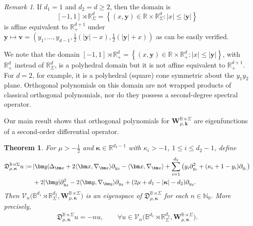 \documentclass{amsart}
\newtheorem{thm}{Theorem}[section]
\theoremstyle{remark}
\newtheorem{rem}{Remark}[section]\newtheorem*{notation}{Notation}
\def\la{{\langle}}
\def\ra{{\rangle}}
\def\fD{{\mathfrak D}}
\def\k{{\kappa}}
\def\la{{\langle}}
\def\ra{{\rangle}}
\def\kb{{\bm k}}
\def\vb{{\bm v}}
\def\yb{{\bm y}}
\def\Wb{{\bm W}}
\def\CV{{\mathcal V}}
\def\BB{{\mathbb B}}
\def\NN{{\mathbb N}}
\def\RR{{\mathbb R}}
\def\bk{{\boldsymbol{\kappa}}}
\def\f{\frac}
\begin{document}
\begin{rem} \label{rem:B-Sig}
If $d_1 =1$ and $d_2 = d \ge 2$, then the domain is 
$$
 [-1,1] \rtimes \RR_\Sigma^d = \left \{(x, \yb) \in \RR \times \RR_\Sigma^d: |x| \le |\yb| \right\}
$$
is affine equivalent to $\RR_+^{d+1}$ under $\yb \mapsto \vb = (y_1,\ldots, y_{d-1}, \frac12(|\yb|- x), \frac12 (|\yb|+x))$
as can be easily verified.  

We note that the domain $[-1,1] \rtimes \RR_+^d = \left \{(x, \yb) \in \RR \times \RR_+^d: |x| \le |\yb| \right\}$,
with $\RR_+^d$ instead of $\RR_\Sigma^d$, is a polyhedral domain but it is not affine equivalent to $\RR_+^{d+1}$. 
For $d = 2$, for example, it is a polyhedral (square) cone symmetric about the $y_1 y_2$ plane. 
Orthogonal polynomials on this domain are not wrapped products of classical orthogonal polynomials, 
nor do they possess a second-degree spectral operator.
\end{rem}

Our main result shows that orthogonal polynomials for $\Wb_{\mu, \kb}^{\BB\rtimes \Sigma}$ are 
eigenfunctions of a second-order differential operator. 

\begin{thm}\label{thm:B-Sig}
For $\mu > -\f12$ and $\bk \in \RR^{d_2-1}$ with $\k_i > -1$, $1 \le i \le d_2-1$, define
\begin{align} \label{eq:B-Sig}
  \fD_{\mu,\bk}^{\BB\rtimes \Sigma} u : = \, &   |\bm y| \Delta_{\bm x} + 2 \la \bm x, \nabla_{\bm x} \ra \partial_{y_d} - 
   \la \bm x, \nabla_{\bm x} \ra 
      +  \sum_{i=1}^{d_2} \left( y_i \partial_{y_i}^2 + (\kappa_i +1 - y_i) \partial_{y_i} \right)  \\
   &  + 2 |\yb| \partial_{y_d}^2 - 2 \la \bm y, \nabla_{\bm y} \ra \partial_{y_d} + (2\mu + d_1 - |\bk| - d_2) \partial_{y_d}. \notag
\end{align}
Then $\CV_n\big(\BB^{d_1} \rtimes \RR_\Sigma^{d_2}, \bm W_{\mu, \bk}^{\BB\rtimes \Sigma}\big)$ is an eigenspace of 
$ \fD_{\mu,\bk}^{\BB\rtimes \Sigma}$ for each $n \in \NN_0$. More precisely, 
\begin{align} \label{eq:B-Sig-eigen}
  \fD_{\mu,\bk}^{\BB \rtimes \Sigma} u = - n u, \qquad \forall 
         u \in \CV_n\big (\BB^{d_1} \rtimes \RR_\Sigma^{d_2}, \bm W_{\mu, \bk}^{\BB\rtimes \Sigma}\big).
\end{align}
\end{thm}
\end{document}
